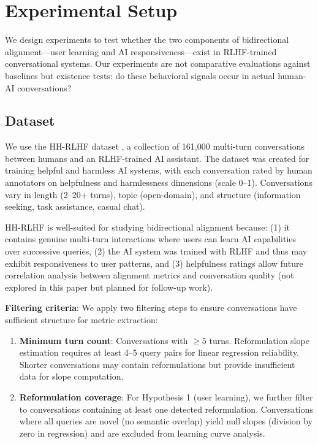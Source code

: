 \section{Experimental Setup}
\label{sec:experiments}

We design experiments to test whether the two components of bidirectional alignment---user learning and AI responsiveness---exist in RLHF-trained conversational systems. Our experiments are not comparative evaluations against baselines but existence tests: do these behavioral signals occur in actual human-AI conversations?

\subsection{Dataset}

We use the HH-RLHF dataset \cite{bai2022constitutional}, a collection of 161,000 multi-turn conversations between humans and an RLHF-trained AI assistant. The dataset was created for training helpful and harmless AI systems, with each conversation rated by human annotators on helpfulness and harmlessness dimensions (scale 0--1). Conversations vary in length (2--20+ turns), topic (open-domain), and structure (information seeking, task assistance, casual chat).

HH-RLHF is well-suited for studying bidirectional alignment because: (1) it contains genuine multi-turn interactions where users can learn AI capabilities over successive queries, (2) the AI system was trained with RLHF and thus may exhibit responsiveness to user patterns, and (3) helpfulness ratings allow future correlation analysis between alignment metrics and conversation quality (not explored in this paper but planned for follow-up work).

\textbf{Filtering criteria}: We apply two filtering steps to ensure conversations have sufficient structure for metric extraction:

\begin{enumerate}
\item \textbf{Minimum turn count}: Conversations with $\geq 5$ turns. Reformulation slope estimation requires at least 4--5 query pairs for linear regression reliability. Shorter conversations may contain reformulations but provide insufficient data for slope computation.

\item \textbf{Reformulation coverage}: For Hypothesis 1 (user learning), we further filter to conversations containing at least one detected reformulation. Conversations where all queries are novel (no semantic overlap) yield null slopes (division by zero in regression) and are excluded from learning curve analysis.
\end{enumerate}

